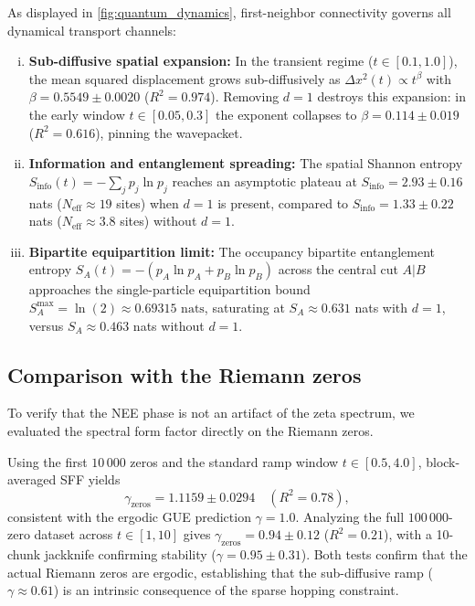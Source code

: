 \documentclass[11pt,a4paper]{article}
\begin{document}
As displayed in \cref{fig:quantum_dynamics}, first-neighbor connectivity governs all dynamical transport channels:

\begin{enumerate}[(i)]
    \item \textbf{Sub-diffusive spatial expansion:} In the transient regime ($t \in [0.1, 1.0]$), the mean squared displacement grows sub-diffusively as $\Delta x^2(t) \propto t^\beta$ with $\beta = 0.5549 \pm 0.0020$ ($R^2 = 0.974$). Removing $d=1$ destroys this expansion: in the early window $t \in [0.05, 0.3]$ the exponent collapses to $\beta = 0.114 \pm 0.019$ ($R^2 = 0.616$), pinning the wavepacket.

    \item \textbf{Information and entanglement spreading:} The spatial Shannon entropy $S_{\text{info}}(t) = -\sum_j p_j \ln p_j$ reaches an asymptotic plateau at $S_{\text{info}} = 2.93 \pm 0.16$ nats ($N_{\text{eff}} \approx 19$ sites) when $d=1$ is present, compared to $S_{\text{info}} = 1.33 \pm 0.22$ nats ($N_{\text{eff}} \approx 3.8$ sites) without $d=1$.

    \item \textbf{Bipartite equipartition limit:} The occupancy bipartite entanglement entropy $S_A(t) = -(p_A \ln p_A + p_B \ln p_B)$ across the central cut $A|B$ approaches the single-particle equipartition bound $S_A^{\max} = \ln(2) \approx 0.69315\text{ nats}$, saturating at $S_A \approx 0.631$ nats with $d=1$, versus $S_A \approx 0.463$ nats without $d=1$.
\end{enumerate}

\subsection{Comparison with the Riemann zeros}
\label{subsec:zeros_control}

To verify that the NEE phase is not an artifact of the zeta spectrum,
we evaluated the spectral form factor directly on the Riemann zeros.

Using the first $10\,000$ zeros and the standard ramp window $t \in [0.5, 4.0]$, block-averaged SFF yields
\begin{equation}
\gamma_{\text{zeros}} = 1.1159 \pm 0.0294 \quad (R^2 = 0.78),
\end{equation}
consistent with the ergodic GUE prediction $\gamma = 1.0$. Analyzing the full $100\,000$-zero dataset across $t \in [1, 10]$ gives $\gamma_{\text{zeros}} = 0.94 \pm 0.12$ ($R^2 = 0.21$), with a 10-chunk jackknife confirming stability ($\gamma = 0.95 \pm 0.31$). Both tests confirm that the actual Riemann zeros are ergodic, establishing that the sub-diffusive ramp ($\gamma \approx 0.61$) is an intrinsic consequence of the sparse hopping constraint.
\end{document}
